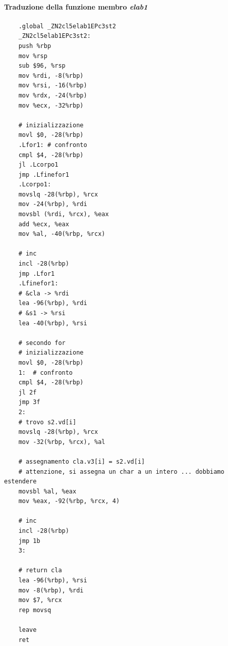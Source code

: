 \paragraph{Traduzione della funzione membro \emph{elab1}} 
\begin{verbatim}
	.global _ZN2cl5elab1EPc3st2
	_ZN2cl5elab1EPc3st2:
	push %rbp
	mov %rsp
	sub $96, %rsp
	mov %rdi, -8(%rbp)
	mov %rsi, -16(%rbp)
	mov %rdx, -24(%rbp)
	mov %ecx, -32%rbp)
	
	# inizializzazione
	movl $0, -28(%rbp)
	.Lfor1: # confronto
	cmpl $4, -28(%rbp)
	jl .Lcorpo1
	jmp .Lfinefor1
	.Lcorpo1:
	movslq -28(%rbp), %rcx
	mov -24(%rbp), %rdi
	movsbl (%rdi, %rcx), %eax
	add %ecx, %eax
	mov %al, -40(%rbp, %rcx)
	
	# inc
	incl -28(%rbp)
	jmp .Lfor1
	.Lfinefor1:
	# &cla -> %rdi   
	lea -96(%rbp), %rdi
	# &s1 -> %rsi
	lea -40(%rbp), %rsi
	
	# secondo for
	# inizializzazione
	movl $0, -28(%rbp)
	1:  # confronto
	cmpl $4, -28(%rbp)
	jl 2f
	jmp 3f
	2:
	# trovo s2.vd[i]
	movslq -28(%rbp), %rcx
	mov -32(%rbp, %rcx), %al
	
	# assegnamento cla.v3[i] = s2.vd[i]
	# attenzione, si assegna un char a un intero ... dobbiamo estendere
	movsbl %al, %eax
	mov %eax, -92(%rbp, %rcx, 4)
	
	# inc
	incl -28(%rbp)
	jmp 1b
	3:
	
	# return cla
	lea -96(%rbp), %rsi
	mov -8(%rbp), %rdi
	mov $7, %rcx
	rep movsq
	
	leave
	ret
\end{verbatim}
